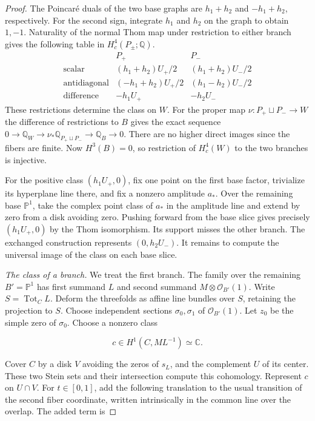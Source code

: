 \begin{proof}
The Poincaré duals of the two base graphs are $h_1+h_2$ and
$-h_1+h_2$, respectively. For the second sign, integrate $h_1$
and $h_2$ on the graph to obtain $1,-1$. Naturality of the
normal Thom map under restriction to either branch gives the
following table in $H_c^4(P_\pm;\mathbb Q)$.
\[
\begin{array}{lcc}
 & P_+ & P_- \\ \hline
\text{scalar} & (h_1+h_2)U_+/2 &(h_1+h_2)U_-/2\\
\text{antidiagonal} & (-h_1+h_2)U_+/2 &(h_1-h_2)U_-/2\\
\text{difference} &-h_1U_+ &-h_2U_-
\end{array}
\]
These restrictions determine the class on $W$. For the proper
map $\nu:P_+\sqcup P_-\to W$ the difference of restrictions
to $B$ gives the exact sequence
$0\to\mathbb Q_W\to\nu_*\mathbb Q_{P_+\sqcup P_-}
\to\mathbb Q_B\to0$. There are no higher direct images since the
fibers are finite. Now $H^3(B)=0$, so restriction of $H_c^4(W)$
to the two branches is injective.

For the positive class $(h_1U_+,0)$, fix one point on the first
base factor, trivialize its hyperplane line there, and fix a nonzero
amplitude $a_*$. Over the remaining base $\mathbb P^1$, take
the complex point class of $a_*$ in the amplitude line and extend
by zero from a disk avoiding zero. Pushing forward from the base
slice gives precisely $(h_1U_+,0)$ by the Thom isomorphism. Its
support misses the other branch. The exchanged construction
represents $(0,h_2U_-)$. It remains to compute the universal
image of the class on each base slice.

\smallskip\noindent\emph{The class of a branch.}
We treat the first branch. The family over the remaining
$B'=\mathbb P^1$ has first summand $L$ and second summand
$M\otimes\mathcal O_{B'}(1)$. Write $S=\operatorname{Tot}_C L$.
Deform the threefolds as affine line bundles over $S$, retaining
the projection to $S$. Choose independent sections
$\sigma_0,\sigma_1$ of $\mathcal O_{B'}(1)$. Let $z_0$ be
the simple zero of $\sigma_0$. Choose a nonzero class

\[
     c\in H^1(C,ML^{-1})\simeq\mathbb C .
\]

Cover $C$ by a disk $V$ avoiding the zeros of $s_L$, and the
complement $U$ of its center. These two Stein sets and their
intersection compute this cohomology. Represent $c$ on $U\cap V$.
For $t\in[0,1]$, add the following translation to the usual
transition of the second fiber coordinate, written intrinsically
in the common line over the overlap. The added term is


\end{proof}
